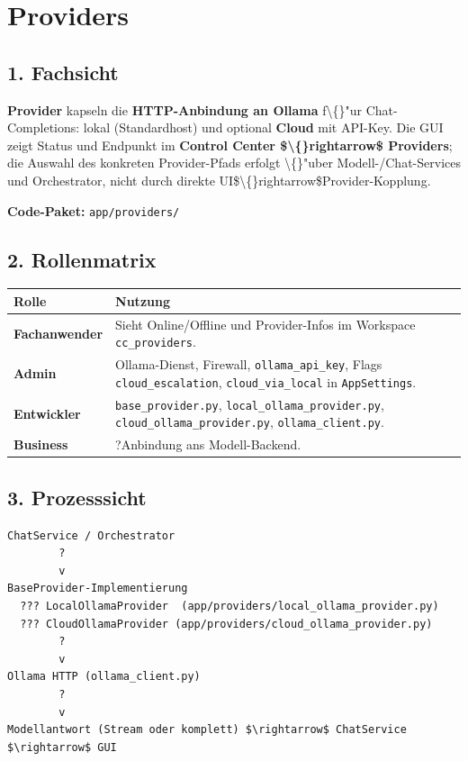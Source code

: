 \section{Providers}

\subsection{1. Fachsicht}

\textbf{Provider} kapseln die \textbf{HTTP-Anbindung an Ollama} f\textbackslash\{\}"ur Chat-Completions: lokal (Standardhost) und optional \textbf{Cloud} mit API-Key. Die GUI zeigt Status und Endpunkt im \textbf{Control Center \$\textbackslash\{\}rightarrow\$ Providers}; die Auswahl des konkreten Provider-Pfads erfolgt \textbackslash\{\}"uber Modell-/Chat-Services und Orchestrator, nicht durch direkte UI\$\textbackslash\{\}rightarrow\$Provider-Kopplung.

\textbf{Code-Paket:} \texttt{app/providers/}

\subsection{2. Rollenmatrix}

\begin{center}
\begin{tabular}{ll}
\hline
Rolle & Nutzung \\
\hline
\textbf{Fachanwender} & Sieht Online/Offline und Provider-Infos im Workspace \texttt{cc\_providers}. \\
\textbf{Admin} & Ollama-Dienst, Firewall, \texttt{ollama\_api\_key}, Flags \texttt{cloud\_escalation}, \texttt{cloud\_via\_local} in \texttt{AppSettings}. \\
\textbf{Entwickler} & \texttt{base\_provider.py}, \texttt{local\_ollama\_provider.py}, \texttt{cloud\_ollama\_provider.py}, \texttt{ollama\_client.py}. \\
\textbf{Business} & ?Anbindung ans Modell-Backend\texttt{}. \\
\hline
\end{tabular}
\end{center}

\subsection{3. Prozesssicht}

\begin{verbatim}
ChatService / Orchestrator
        ?
        v
BaseProvider-Implementierung
  ??? LocalOllamaProvider  (app/providers/local_ollama_provider.py)
  ??? CloudOllamaProvider (app/providers/cloud_ollama_provider.py)
        ?
        v
Ollama HTTP (ollama_client.py)
        ?
        v
Modellantwort (Stream oder komplett) $\rightarrow$ ChatService $\rightarrow$ GUI
\end{verbatim}

